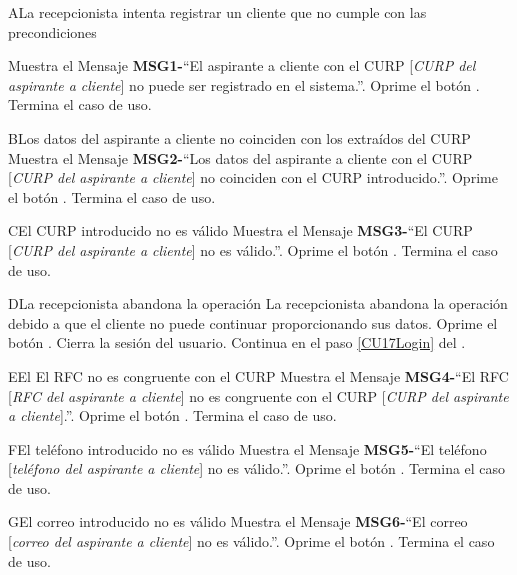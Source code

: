 		\begin{UCtrayectoriaA}{A}{La recepcionista intenta registrar un cliente que no cumple con las precondiciones}
		
			\UCpaso Muestra el Mensaje {\bf MSG1-}``El aspirante a cliente con el CURP [{\em CURP del aspirante a cliente}] no puede ser registrado en el sistema.''.
			\UCpaso[\UCactor] Oprime el botón .
			\UCpaso[] Termina el caso de uso.
		\end{UCtrayectoriaA}
		
		\begin{UCtrayectoriaA}{B}{Los datos del aspirante a cliente no coinciden con los extraídos del CURP}
			\UCpaso Muestra el Mensaje {\bf MSG2-}``Los datos del aspirante a cliente con el CURP [{\em CURP del aspirante a cliente}] no coinciden con el CURP introducido.''.
			\UCpaso[\UCactor] Oprime el botón .
			\UCpaso[] Termina el caso de uso.
		\end{UCtrayectoriaA}
		
		
		\begin{UCtrayectoriaA}{C}{El CURP introducido no es válido}
			\UCpaso Muestra el Mensaje {\bf MSG3-}``El CURP [{\em CURP del aspirante a cliente}] no es válido.''.
			\UCpaso[\UCactor] Oprime el botón .
			\UCpaso[] Termina el caso de uso.
		\end{UCtrayectoriaA}
		
		
		\begin{UCtrayectoriaA}{D}{La recepcionista abandona la operación}
			\UCpaso La recepcionista abandona la operación debido a que el cliente no puede continuar proporcionando sus datos.
			\UCpaso[\UCactor] Oprime el botón .
			\UCpaso Cierra la sesión del usuario.
			\UCpaso Continua en el paso \ref{CU17Login} del .
		\end{UCtrayectoriaA}		
		
		
		\begin{UCtrayectoriaA}{E}{El El RFC no es congruente con el CURP}
			\UCpaso Muestra el Mensaje {\bf MSG4-}``El RFC [{\em RFC del aspirante a cliente}] no es congruente con el CURP [{\em CURP del aspirante a cliente}].''.
			\UCpaso[\UCactor] Oprime el botón .
			\UCpaso[] Termina el caso de uso.
		\end{UCtrayectoriaA}
		
		
		\begin{UCtrayectoriaA}{F}{El teléfono introducido no es válido}
			\UCpaso Muestra el Mensaje {\bf MSG5-}``El teléfono [{\em teléfono del aspirante a cliente}] no es válido.''.
			\UCpaso[\UCactor] Oprime el botón .
			\UCpaso[] Termina el caso de uso.
		\end{UCtrayectoriaA}
		
		
		\begin{UCtrayectoriaA}{G}{El correo introducido no es válido}
			\UCpaso Muestra el Mensaje {\bf MSG6-}``El correo [{\em correo del aspirante a cliente}] no es válido.''.
			\UCpaso[\UCactor] Oprime el botón .
			\UCpaso[] Termina el caso de uso.
		\end{UCtrayectoriaA}
		

		
